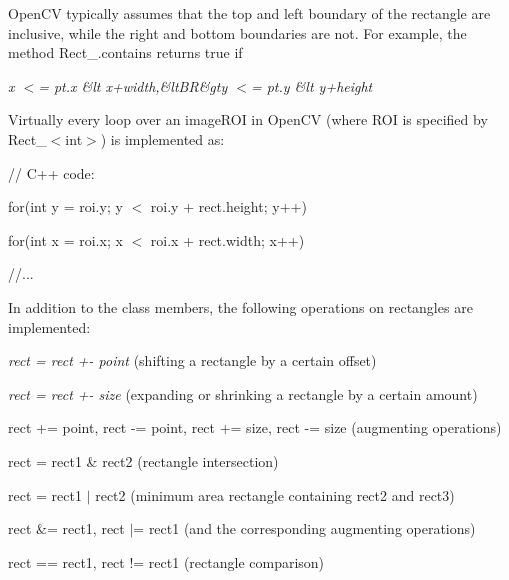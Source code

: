 Open\+CV typically assumes that the top and left boundary of the rectangle are inclusive, while the right and bottom boundaries are not. For example, the method {\ttfamily Rect\+\_\+.\+contains} returns {\ttfamily true} if

{\itshape x $<$= pt.\+x \&lt x+width,\&lt\+BR\&gty $<$= pt.\+y \&lt y+height}

Virtually every loop over an image\+R\+OI in Open\+CV (where R\+OI is specified by {\ttfamily Rect\+\_\+$<$int$>$}) is implemented as\+: {\ttfamily }

{\ttfamily }

{\ttfamily }

{\ttfamily // C++ code\+:}

{\ttfamily }

{\ttfamily }

{\ttfamily for(int y = roi.\+y; y $<$ roi.\+y + rect.\+height; y++)}

{\ttfamily }

{\ttfamily }

{\ttfamily for(int x = roi.\+x; x $<$ roi.\+x + rect.\+width; x++)}

{\ttfamily }

{\ttfamily }

{\ttfamily //...}

{\ttfamily }

{\ttfamily }

{\ttfamily In addition to the class members, the following operations on rectangles are implemented\+: }


\begin{DoxyItemize}
\item {\itshape rect = rect +-\/ point} (shifting a rectangle by a certain offset) 
\item {\itshape rect = rect +-\/ size} (expanding or shrinking a rectangle by a certain amount) 
\item {\ttfamily rect += point, rect -\/= point, rect += size, rect -\/= size} (augmenting operations) 
\item {\ttfamily rect = rect1 \& rect2} (rectangle intersection) 
\item {\ttfamily rect = rect1 $\vert$ rect2} (minimum area rectangle containing {\ttfamily rect2} and {\ttfamily rect3}) 
\item {\ttfamily rect \&= rect1, rect $\vert$= rect1} (and the corresponding augmenting operations) 
\item {\ttfamily rect == rect1, rect != rect1} (rectangle comparison) 
\end{DoxyItemize}

